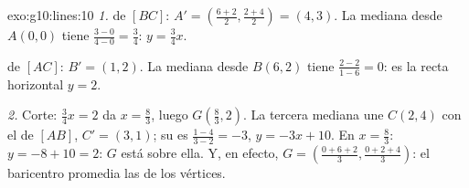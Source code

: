\begin{solution}{exo:g10:lines:10}
\emph{1.}  de $[BC]$: $A' = \left(\frac{6+2}{2},
\frac{2+4}{2}\right) = (4, 3)$. La mediana desde $A(0,0)$ tiene 
$\frac{3 - 0}{4 - 0} = \frac34$:  $y = \frac34 x$.

 de $[AC]$: $B' = (1, 2)$. La mediana desde $B(6, 2)$ tiene
 $\frac{2 - 2}{1 - 6} = 0$: es la recta horizontal $y = 2$.

\emph{2.} Corte: $\frac34 x = 2$ da $x = \frac83$, luego
$G\left(\frac83, 2\right)$. La tercera mediana une $C(2,4)$ con el  de $[AB]$, $C' = (3, 1)$; su  es
$\frac{1 - 4}{3 - 2} = -3$,  $y = -3x + 10$. En $x = \frac83$:
$y = -8 + 10 = 2$: $G$ está sobre ella. Y, en efecto,
$G = \left(\frac{0 + 6 + 2}{3}, \frac{0 + 2 + 4}{3}\right)$: el baricentro
promedia las  de los vértices.
\end{solution}

